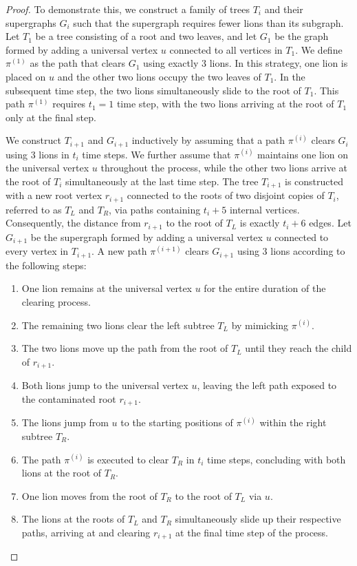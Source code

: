 \documentclass[a4paper,UKenglish,cleveref, autoref, thm-restate]{lipics-v2021}
\begin{document}
\begin{proof}
To demonstrate this, we construct a family of trees $T_i$ and their supergraphs $G_i$ such that the supergraph requires fewer lions than its subgraph. Let $T_1$ be a tree consisting of a root and two leaves, and let $G_1$ be the graph formed by adding a universal vertex $u$ connected to all vertices in $T_1$. We define $\pi^{(1)}$ as the path that clears $G_1$ using exactly $3$ lions. In this strategy, one lion is placed on $u$ and the other two lions occupy the two leaves of $T_1$. In the subsequent time step, the two lions simultaneously slide to the root of $T_1$. This path $\pi^{(1)}$ requires $t_1 = 1$ time step, with the two lions arriving at the root of $T_1$ only at the final step.

We construct $T_{i+1}$ and $G_{i+1}$ inductively by assuming that a path $\pi^{(i)}$ clears $G_i$ using $3$ lions in $t_i$ time steps. We further assume that $\pi^{(i)}$ maintains one lion on the universal vertex $u$ throughout the process, while the other two lions arrive at the root of $T_i$ simultaneously at the last time step. The tree $T_{i+1}$ is constructed with a new root vertex $r_{i+1}$ connected to the roots of two disjoint copies of $T_i$, referred to as $T_L$ and $T_R$, via paths containing $t_i+5$ internal vertices. Consequently, the distance from $r_{i+1}$ to the root of $T_L$ is exactly $t_i+6$ edges. Let $G_{i+1}$ be the supergraph formed by adding a universal vertex $u$ connected to every vertex in $T_{i+1}$. A new path $\pi^{(i+1)}$ clears $G_{i+1}$ using $3$ lions according to the following steps:

\begin{enumerate}
    \item One lion remains at the universal vertex $u$ for the entire duration of the clearing process.
    \item The remaining two lions clear the left subtree $T_L$ by mimicking $\pi^{(i)}$.
    \item The two lions move up the path from the root of $T_L$ until they reach the child of $r_{i+1}$.
    \item Both lions jump to the universal vertex $u$, leaving the left path exposed to the contaminated root $r_{i+1}$.
    \item The lions jump from $u$ to the starting positions of $\pi^{(i)}$ within the right subtree $T_R$.
    \item The path $\pi^{(i)}$ is executed to clear $T_R$ in $t_i$ time steps, concluding with both lions at the root of $T_R$.
    \item One lion moves from the root of $T_R$ to the root of $T_L$ via $u$.
    \item The lions at the roots of $T_L$ and $T_R$ simultaneously slide up their respective paths, arriving at and clearing $r_{i+1}$ at the final time step of the process.
\end{enumerate}


\end{proof}
\end{document}
